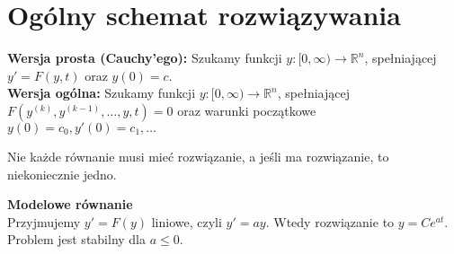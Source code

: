 \section{Ogólny schemat rozwiązywania}
\textbf{Wersja prosta (Cauchy’ego): } Szukamy funkcji \(y: [0, \infty) \rightarrow \mathbb{R}^n \), spełniającej \( y' = F(y,t) \) oraz \( y(0) = c \). \\
\textbf{Wersja ogólna:} Szukamy funkcji \(y: [0, \infty) \rightarrow \mathbb{R}^n \), spełniającej \( F(y^{(k)}, y^{(k-1)}, \dots, y, t) = 0 \) oraz warunki początkowe \( y(0) = c_0, y'(0) = c_1, \dots \)
\begin{warning}
    Nie każde równanie musi mieć rozwiązanie, a jeśli ma rozwiązanie, to niekoniecznie jedno.
\end{warning}

\noindent
\textbf{Modelowe równanie} \\
Przyjmujemy \( y' = F(y) \) liniowe, czyli \( y' = ay \). Wtedy rozwiązanie to \( y = Ce^{at} \). Problem jest stabilny dla \( a \leq 0 \).